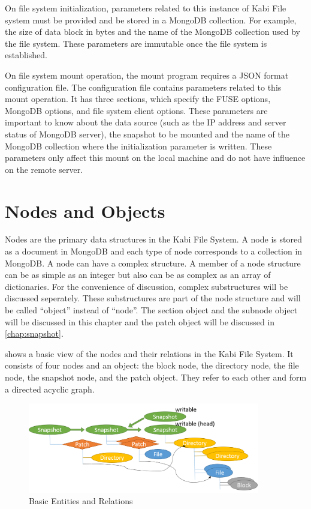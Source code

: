     On file system initialization, parameters related to this instance of Kabi File system must be provided and be stored in a MongoDB collection. For example, the size of data block in bytes and the name of the MongoDB collection used by the file system. These parameters are immutable once the file system is established.

    On file system mount operation, the mount program requires a JSON format configuration file. The configuration file contains parameters related to this mount operation. It has three sections, which specify the FUSE options, MongoDB options, and file system client options. These parameters are important to know about the data source (such as the IP address and server status of MongoDB server), the snapshot to be mounted and the name of the MongoDB collection where the initialization parameter is written. These parameters only affect this mount on the local machine and do not have influence on the remote server.

\section{Nodes and Objects}

    Nodes are the primary data structures in the Kabi File System. A node is stored as a document in MongoDB and each type of node corresponds to a collection in MongoDB. A node can have a complex structure. A member of a node structure can be as simple as an integer but also can be as complex as an array of dictionaries. For the convenience of discussion, complex substructures will be discussed seperately. These substructures are part of the node structure and will be called ``object'' instead of ``node''. The section object and the subnode object will be discussed in this chapter and the patch object will be discussed in \cref{chap:snapshot}.

     shows a basic view of the nodes and their relations in the Kabi File System. It consists of four nodes and an object: the block node, the directory node, the file node, the snapshot node, and the patch object. They refer to each other and form a directed acyclic graph. 

\begin{figure}[hbtp]
\centering
\includegraphics[width=0.9\textwidth]{Chapter-3/figs/fig2.png}
\caption{Basic Entities and Relations}
\label{fig:basic_entities}
\end{figure}

